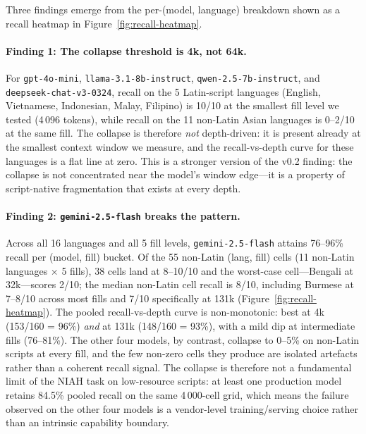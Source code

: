 \documentclass[11pt,a4paper]{article}
\begin{document}
Three findings emerge from the per-(model, language) breakdown shown as a recall heatmap in Figure~\ref{fig:recall-heatmap}.

\paragraph{Finding 1: The collapse threshold is 4k, not 64k.} For \texttt{gpt-4o-mini}, \texttt{llama-3.1-8b-instruct}, \texttt{qwen-2.5-7b-instruct}, and \texttt{deepseek-chat-v3-0324}, recall on the 5 Latin-script languages (English, Vietnamese, Indonesian, Malay, Filipino) is 10/10 at the smallest fill level we tested (4\,096 tokens), while recall on the 11 non-Latin Asian languages is 0--2/10 at the same fill. The collapse is therefore \emph{not} depth-driven: it is present already at the smallest context window we measure, and the recall-vs-depth curve for these languages is a flat line at zero. This is a stronger version of the v0.2 finding: the collapse is not concentrated near the model's window edge---it is a property of script-native fragmentation that exists at every depth.

\paragraph{Finding 2: \texttt{gemini-2.5-flash} breaks the pattern.} Across all 16 languages and all 5 fill levels, \texttt{gemini-2.5-flash} attains 76--96\% recall per (model, fill) bucket. Of the 55 non-Latin (lang, fill) cells (11 non-Latin languages $\times$ 5 fills), 38 cells land at 8--10/10 and the worst-case cell---Bengali at 32k---scores 2/10; the median non-Latin cell recall is 8/10, including Burmese at 7--8/10 across most fills and 7/10 specifically at 131k (Figure~\ref{fig:recall-heatmap}). The pooled recall-vs-depth curve is non-monotonic: best at 4k (153/160 = 96\%) \emph{and} at 131k (148/160 = 93\%), with a mild dip at intermediate fills (76--81\%). The other four models, by contrast, collapse to 0--5\% on non-Latin scripts at every fill, and the few non-zero cells they produce are isolated artefacts rather than a coherent recall signal. The collapse is therefore not a fundamental limit of the NIAH task on low-resource scripts: at least one production model retains 84.5\% pooled recall on the same 4\,000-cell grid, which means the failure observed on the other four models is a vendor-level training/serving choice rather than an intrinsic capability boundary.
\end{document}
